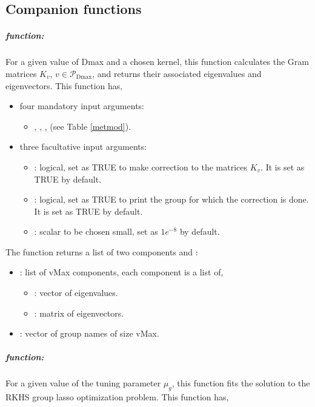 \subsection{Companion functions}\label{subsec:Comp}
\subparagraph{ function:} For a given value of Dmax and a chosen kernel, this function calculates the Gram matrices $K_v$, $v\in\mathcal{P}_{\text{Dmax}}$, and returns their associated eigenvalues and eigenvectors. 
This function has,
\begin{itemize}
\item four mandatory input arguments: 
\begin{itemize}
\item {}, , ,  (see Table \ref{metmod}).
\end{itemize}
\item three facultative input arguments: 
\begin{itemize}
\item {}: logical, set as TRUE to make correction to the matrices $K_v$. It is set as TRUE by default.
\item {}: logical, set as TRUE to print the group for which the correction is done. It is set as TRUE by default.
\item {}: scalar to be chosen small, set as $1e^{-8}$ by default.
\end{itemize}
\end{itemize}
The  function returns a list of two components  and :
\begin{itemize}
\item {}: list of vMax components, each component is a list of, 
\begin{itemize}
\item {}: vector of eigenvalues.
\item {}: matrix of eigenvectors.
\end{itemize}
\item {}: vector of group names of size vMax.
\end{itemize}
\subparagraph*{ function:} 
For a given value of the tuning parameter $\mu_g$, this function fits the solution to the RKHS group lasso optimization problem.  
This function has, 
